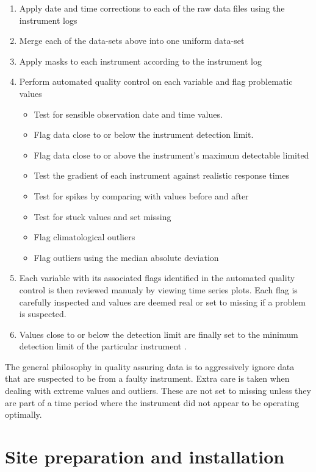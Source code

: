 \documentclass{nwureport}
\begin{document}
\begin{enumerate}
\item Apply date and time corrections to each of the raw data files
  using the instrument logs
\item Merge each of the data-sets above into one uniform data-set
\item Apply masks to each instrument according to the instrument log
\item Perform automated quality control on each variable and flag problematic values
  \begin{itemize}
   \item Test for sensible observation date and time values.
   \item Flag data close to or below the instrument detection limit. 
   \item Flag data close to or above the instrument's maximum detectable limited
   \item Test the gradient of each instrument against realistic response times
   \item Test for spikes by comparing with values before and after
   \item Test for stuck values and set missing
   \item Flag climatological outliers
   \item Flag outliers using the median absolute deviation
  \end{itemize}
\item Each variable with its associated flags identified in the automated quality control is then reviewed manualy by viewing time series plots. Each flag is carefully inspected and values are deemed real or set to missing if a problem is suspected.
\item Values close to or below the detection limit are finally set to the minimum detection limit of the particular instrument \citep{Croghan2003}.
\end{enumerate}

The general philosophy in quality assuring data is to aggressively
ignore data that are suspected to be from a faulty instrument. Extra
care is taken when dealing with extreme values and outliers. These are
not set to missing unless they are part of a time period where the
instrument did not appear to be operating optimally.

\chapter{Site preparation and installation}
\label{sec:site}
\end{document}
